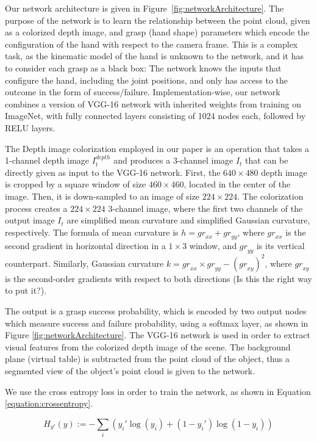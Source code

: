 Our network architecture is given in Figure~\ref{fig:networkArchitecture}. The purpose of the network is to learn the relationship between the point cloud, given as a colorized depth image, and grasp (hand shape) parameters which encode the configuration of the hand with respect to the camera frame. This is a complex task, as the kinematic model of the hand is unknown to the network, and it has to consider each grasp as a black box: The network knows the inputs that configure the hand, including the joint positions, and only has access to the outcome in the form of success/failure. Implementation-wise, our network combines a version of VGG-16 network with inherited weights from training on ImageNet, with fully connected layers consisting of 1024 nodes each, followed by RELU layers. 

The Depth image colorization employed in our paper is an operation that takes a 1-channel depth image $I_{t}^{depth}$ and produces a 3-channel image $I_t$ that can be directly given as input to the VGG-16 network. First, the $640 \times 480$ depth image is cropped by a square window of size $460 \times 460$, located in the center of the image. Then, it is down-sampled to an image of size $224 \times 224$. The colorization process creates a $224 \times 224$ 3-channel image, where the first two channels of the output image $I_t$ are simplified mean curvature and simplified Gaussian curvature, respectively. The formula of mean curvature is $h = {gr}_{xx} + {gr}_{yy}$, where ${gr}_{xx}$ is the second gradient in horizontal direction in a $1 \times 3$ window, and ${gr}_{yy}$ is its vertical counterpart. Similarly, Gaussian curvature $k = {gr}_{xx} \times {gr}_{yy} - ({gr}_{xy})^2$, where ${gr}_{xy}$ is the second-order gradients with respect to both directions (Is this the right way to put it?).

The output is a grasp success probability, which is encoded by two output nodes which measure success and failure probability, using a softmax layer, as shown in Figure \ref{fig:networkArchitecture}. The VGG-16 network is used in order to extract visual features from the colorized depth image of the scene. The background plane (virtual table) is subtracted from the point cloud of the object, thus a segmented view of the object's point cloud is given to the network. 

We use the cross entropy loss in order to train the network, as shown in Equation \ref{equation:crossentropy}.

\begin{equation}
H_{y'}(y) := - \sum_{i} ({y_i' \log(y_i) + (1-y_i') \log (1-y_i)})
\label{equation:crossentropy}
\end{equation}


